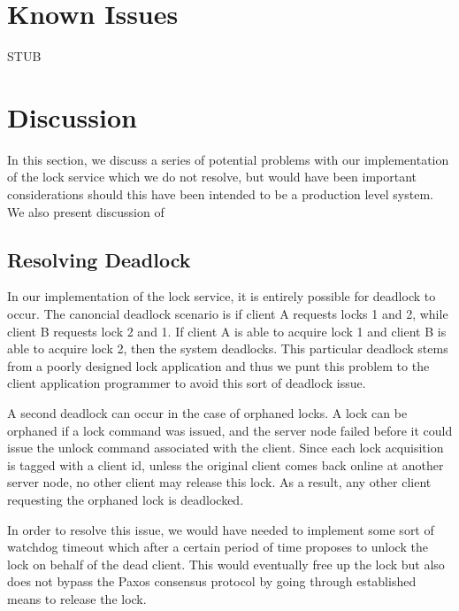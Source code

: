 \documentclass{article}
\begin{document}
\section{Known Issues}

STUB


\section{Discussion}

In this section, we discuss a series of potential problems with our implementation of the lock service which we do not resolve, but would have been important considerations should this have been intended to be a production level system.
We also present discussion of

\subsection{Resolving Deadlock}

In our implementation of the lock service, it is entirely possible for deadlock to occur.
The canoncial deadlock scenario is if client A requests locks 1 and 2, while client B requests lock 2 and 1.
If client A is able to acquire lock 1 and client B is able to acquire lock 2, then the system deadlocks.
This particular deadlock stems from a poorly designed lock application and thus we punt this problem to the client application programmer to avoid this sort of deadlock issue.

A second deadlock can occur in the case of orphaned locks.
A lock can be orphaned if a lock command was issued, and the server node failed before it could issue the unlock command associated with the client.
Since each lock acquisition is tagged with a client id, unless the original client comes back online at another server node, no other client may release this lock.
As a result, any other client requesting the orphaned lock is deadlocked.

In order to resolve this issue, we would have needed to implement some sort of watchdog timeout which after a certain period of time proposes to unlock the lock on behalf of the dead client.
This would eventually free up the lock but also does not bypass the Paxos consensus protocol by going through established means to release the lock.
\end{document}

